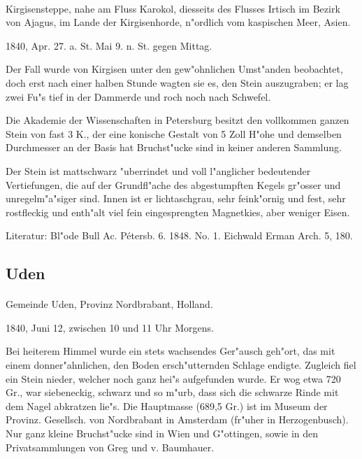 \documentclass[a4paper, 11pt, oneside]{article}
\begin{document}
\paragraph{}
Kirgisensteppe, nahe am Fluss Karokol, diesseits des Flusses Irtisch im Bezirk von Ajagus, im Lande der Kirgisenhorde, n"ordlich vom kaspischen Meer, Asien.

1840, Apr. 27. a. St. Mai 9. n. St. gegen Mittag.

Der Fall wurde von Kirgisen unter den gew"ohnlichen Umst"anden beobachtet, doch erst nach einer halben Stunde wagten sie es, den Stein auszugraben; er lag zwei Fu"s tief in der Dammerde und roch noch nach Schwefel.

Die Akademie der Wissenschaften in Petersburg besitzt den vollkommen ganzen Stein von fast 3 K., der eine konische Gestalt von 5 Zoll H"ohe und demselben Durchmesser an der Basis hat Bruchst"ucke sind in keiner anderen Sammlung.

Der Stein ist mattschwarz "uberrindet und voll l"anglicher bedeutender Vertiefungen, die auf der Grundfl"ache des abgestumpften Kegels gr"osser und unregelm"a"siger sind. Innen ist er lichtaschgrau, sehr feink"ornig und fest, sehr rostfleckig und enth"alt viel fein eingesprengten Magnetkies, aber weniger Eisen.

\footnotesize
Literatur: Bl"ode Bull Ac. Pétersb. 6. 1848. No. 1. Eichwald Erman Arch. 5, 180.

\subsection{Uden}
\normalsize
\paragraph{}
Gemeinde Uden, Provinz Nordbrabant, Holland.

1840, Juni 12, zwischen 10 und 11 Uhr Morgens.

Bei heiterem Himmel wurde ein stets wachsendes Ger"ausch geh"ort, das mit einem donner"ahnlichen, den Boden ersch"utternden Schlage endigte. Zugleich fiel ein Stein nieder, welcher noch ganz hei"s aufgefunden wurde. Er wog etwa 720 Gr., war siebeneckig, schwarz und so m"urb, dass sich die schwarze Rinde mit dem Nagel abkratzen lie"s. Die Hauptmasse (689,5 Gr.) ist im Museum der Provinz. Gesellsch. von Nordbrabant in Amsterdam (fr"uher in Herzogenbusch). Nur ganz kleine Bruchst"ucke sind in Wien und G"ottingen, sowie in den Privatsammlungen von Greg und v. Baumhauer.
\end{document}
